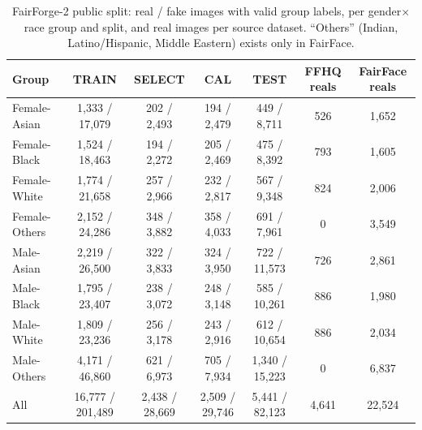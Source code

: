 \documentclass[10pt]{article}
\begin{document}
\begin{table}[h]\centering
\caption{FairForge-2 public split: real / fake images with valid group labels, per gender$\times$race group and split, and
real images per source dataset. ``Others'' (Indian, Latino/Hispanic, Middle Eastern) exists only in FairFace.}
\small\begin{tabular}{l|cccc|cc}\toprule
Group & TRAIN & SELECT & CAL & TEST & FFHQ reals & FairFace reals \\\midrule
Female-Asian & 1,333 / 17,079 & 202 / 2,493 & 194 / 2,479 & 449 / 8,711 & 526 & 1,652 \\
Female-Black & 1,524 / 18,463 & 194 / 2,272 & 205 / 2,469 & 475 / 8,392 & 793 & 1,605 \\
Female-White & 1,774 / 21,658 & 257 / 2,966 & 232 / 2,817 & 567 / 9,348 & 824 & 2,006 \\
Female-Others & 2,152 / 24,286 & 348 / 3,882 & 358 / 4,033 & 691 / 7,961 & 0 & 3,549 \\
Male-Asian & 2,219 / 26,500 & 322 / 3,833 & 324 / 3,950 & 722 / 11,573 & 726 & 2,861 \\
Male-Black & 1,795 / 23,407 & 238 / 3,072 & 248 / 3,148 & 585 / 10,261 & 886 & 1,980 \\
Male-White & 1,809 / 23,236 & 256 / 3,178 & 243 / 2,916 & 612 / 10,654 & 886 & 2,034 \\
Male-Others & 4,171 / 46,860 & 621 / 6,973 & 705 / 7,934 & 1,340 / 15,223 & 0 & 6,837 \\
\midrule
All & 16,777 / 201,489 & 2,438 / 28,669 & 2,509 / 29,746 & 5,441 / 82,123 & 4,641 & 22,524 \\
\bottomrule\end{tabular}\end{table}
\end{document}
